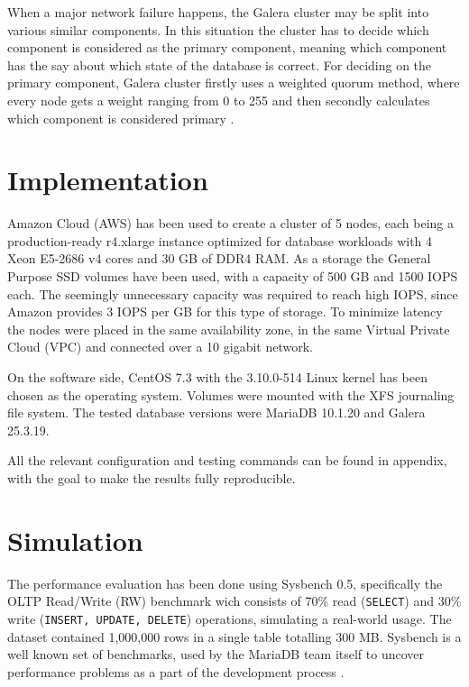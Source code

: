\documentclass{sig-alternate}
\begin{document}
When a major network failure happens, the Galera cluster may be split into various similar components. In this situation the cluster has to decide which component is considered as the primary component, meaning which component has the say about which state of the database is correct. For deciding on the primary component, Galera cluster firstly uses a weighted quorum method, where every node gets a weight ranging from 0 to 255 and then secondly calculates which component is considered primary \cite{galeraquorum}.

\section{Implementation}
Amazon Cloud (AWS) has been used to create a cluster of 5 nodes, each being a production-ready r4.xlarge instance optimized for database workloads \cite{awsinstances} with 4 Xeon E5-2686 v4 cores and 30 GB of DDR4 RAM. As a storage the General Purpose SSD volumes have been used, with a capacity of 500 GB and 1500 IOPS each. The seemingly unnecessary capacity was required to reach high IOPS, since Amazon provides 3 IOPS per GB for this type of storage. To minimize latency the nodes were placed in the same availability zone, in the same Virtual Private Cloud (VPC) and connected over a 10 gigabit network.

On the software side, CentOS 7.3 with the 3.10.0-514 Linux kernel has been chosen as the operating system. Volumes were mounted with the XFS journaling file system. The tested database versions were MariaDB 10.1.20 and Galera 25.3.19.

All the relevant configuration and testing commands can be found in appendix, with the goal to make the results fully reproducible.

\section{Simulation}

The performance evaluation has been done using Sysbench 0.5, specifically the OLTP Read/Write (RW) benchmark wich consists of 70\% read (\texttt{SELECT}) and 30\% write (\texttt{INSERT, UPDATE, DELETE}) operations, simulating a real-world usage. The dataset contained 1,000,000 rows in a single table totalling 300 MB. Sysbench is a well known set of benchmarks, used by the MariaDB team itself to uncover performance problems as a part of the development process \cite{mariadbsysbench}.
\end{document}
